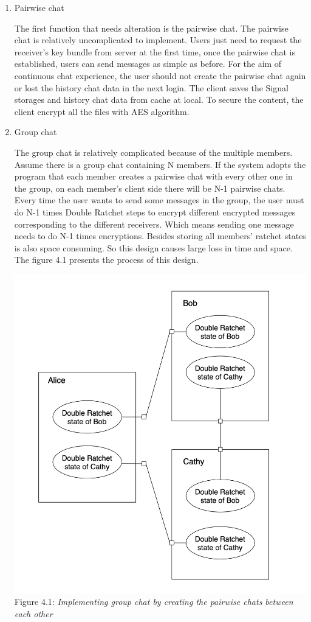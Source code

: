 \begin{enumerate}[label=(\roman*)]
\item Pairwise chat

The first function that needs alteration is the pairwise chat. The pairwise chat is relatively uncomplicated to implement. Users just need to request the receiver's key bundle from server at the first time, once the pairwise chat is established, users can send messages as simple as before. For the aim of continuous chat experience, the user should not create the pairwise chat again or lost the history chat data in the next login. The client saves the Signal storages and history chat data from cache at local. To secure the content, the client encrypt all the files with AES algorithm.

\item Group chat

The group chat is relatively complicated because of the multiple members. Assume there is a group chat containing N members. If the system adopts the program that each member creates a pairwise chat with every other one in the group, on each member's client side there will be N-1 pairwise chats. Every time the user wants to send some messages in the group, the user must do N-1 times Double Ratchet steps to encrypt different encrypted messages corresponding to the different receivers. Which means sending one message needs to do N-1 times encryptions. Besides storing all members' ratchet states is also space consuming. So this design causes large loss in time and space. The figure 4.1 presents the process of this design.

\begin{center}
\includegraphics[scale=.5]{../4-Implementation/resources/Figure4-1.png}\\
Figure 4.1: \textit{Implementing group chat by creating the pairwise chats between each other}
\end{center}


\end{enumerate}
